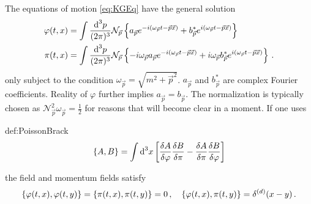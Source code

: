 The equations of motion \eqref{eq:KGEq} have the general solution
\begin{subequations}
    \begin{align}
        \varphi(t,x)               & =\int\frac{\text{d} ^3p}{(2\pi)^3}\mathcal{N}_{\vec{p}}\left\{a_{\vec{p}}e^{-{i}(\omega_{\vec{p}}t-\vec{p}\vec{x})}+b_{\vec{p}}^* e^{{i}(\omega_{\vec{p}}t-\vec{p}\vec{x})}\right\}                                                 \\
        \pi(t,x) & =\int\frac{\text{d} ^3p}{(2\pi)^3}\mathcal{N}_{\vec{p}}\left\{-{i}\omega_{\vec{p}}a_{\vec{p}}e^{-{i}(\omega_{\vec{p}}t-\vec{p}\vec{x})}+{i}\omega_{\vec{p}}b_{\vec{p}}^* e^{{i}(\omega_{\vec{p}}t-\vec{p}\vec{x})}\right\}\,.
    \end{align}
\end{subequations}
only subject to the condition $\omega_{\vec{p}}=\sqrt{m^2+\vec{p}^2}$. $a_{\vec{p}}$ and $b_{\vec{p}}^*$ are complex Fourier coefficients. Reality of $\varphi$ further implies $a_{\vec{p}}=b_{\vec{p}}$. The normalization is typically chosen as $\mathcal{N}_{\vec{p}}^2\omega_{\vec{p}}=\frac{1}{2}$ for reasons that will become clear in a moment. If one uses
\begin{defin}{def:PoissonBrack}
    \begin{equation}
        {\{A,B\}}=\int\text{d}^3x\left[\frac{\delta A}{\delta\varphi}\frac{\delta B}{\delta\pi}-\frac{\delta A}{\delta\pi}\frac{\delta B}{\delta\varphi}\right]
    \end{equation}
\end{defin}
the field and momentum fields satisfy
\begin{equation}
    {\{\varphi(t,x),\varphi(t,y)\}}={\{\pi(t,x),\pi(t,y)\}}=0\,,\quad{\{\varphi(t,x),\pi(t,y)\}}=\delta^{(d)}(x-y)\,.
\end{equation}

